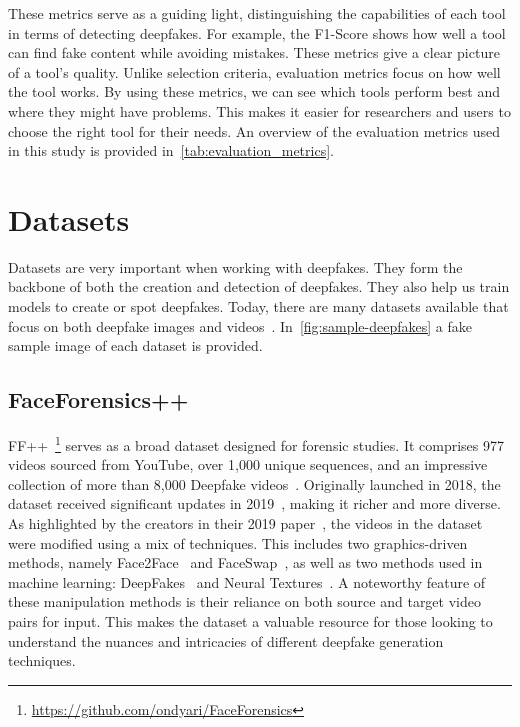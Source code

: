 These metrics serve as a guiding light, distinguishing the capabilities of each tool
in terms of detecting deepfakes. For example, the F1-Score shows how well a tool can
find fake content while avoiding mistakes. These metrics give a clear picture of a
tool's quality. Unlike selection criteria, evaluation metrics focus on how well the
tool works. By using these metrics, we can see which tools perform best and
where they might have problems. This makes it easier for researchers and users to
choose the right tool for their needs.
An overview of the evaluation metrics used in this study is provided in~\autoref{tab:evaluation_metrics}.

\section{Datasets}
Datasets are very important when working with deepfakes. They form the backbone of both
the creation and detection of deepfakes. They also help us train models to create or spot
deepfakes. Today, there are many datasets available that focus on both deepfake images
and videos~\cite{deepfake-dataset,zi2020wilddeepfake,10.1145/3531536.3532946}.
In~\autoref{fig:sample-deepfakes} a fake sample image of each dataset is provided.

\subsection{FaceForensics++}\label{section:ff++}
\ac{FF++}~\footnote{\url{https://github.com/ondyari/FaceForensics}} serves as a
broad dataset designed for forensic studies. It
comprises 977 videos sourced from YouTube, over 1,000 unique sequences, and an
impressive collection of more than 8,000 Deepfake videos~\cite{roessler2019faceforensicspp,masters-thesis}.
Originally launched in 2018, the dataset received significant updates in 2019~\cite{masters-thesis},
making it richer and more diverse. As highlighted by the creators in their 2019 paper~\cite{roessler2019faceforensicspp},
the videos in the dataset were modified using a mix of techniques. This includes two
graphics-driven methods, namely Face2Face~\cite{thies2020face2face} and FaceSwap~\cite{faceswap},
as well as two methods used in machine learning: DeepFakes~\cite{faceswap-deepfake}
and Neural Textures~\cite{thies2019deferred}. A noteworthy feature of these
manipulation methods is their reliance on both source and target video pairs for input.
This makes the dataset a valuable resource for those looking to understand the
nuances and intricacies of different deepfake generation techniques.

